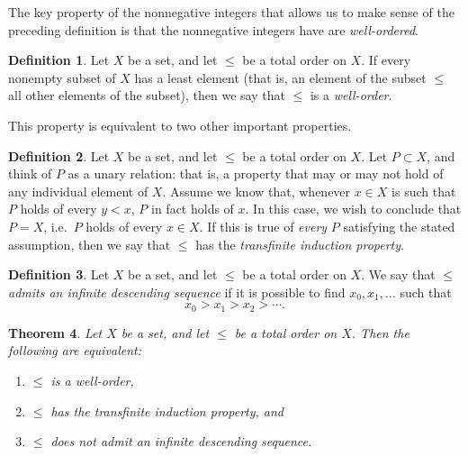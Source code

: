 \documentclass[letterpaper]{article}
\newtheorem{theorem}{Theorem}[section]
\theoremstyle{definition}
\newtheorem{definition}[theorem]{Definition}
\begin{document}
The key property of the nonnegative integers that allows us to make
sense of the preceding definition is that the nonnegative integers
have are \emph{well-ordered}.
\begin{definition}
  Let \(X\) be a set, and let \(\leq\) be a total order on \(X\).  If
  every nonempty subset of \(X\) has a least element (that is, an
  element of the subset \(\leq\) all other elements of the subset),
  then we say that \(\leq\) is a \emph{well-order}.
\end{definition}

This property is equivalent to two other important properties.
\begin{definition}
  Let \(X\) be a set, and let \(\leq\) be a total order on \(X\).  Let
  \(P \subset X\), and think of \(P\) as a unary relation: that is, a
  property that may or may not hold of any individual element of
  \(X\).  Assume we know that, whenever \(x \in X\) is such that \(P\)
  holds of every \(y < x\), \(P\) in fact holds of \(x\).  In this
  case, we wish to conclude that \(P = X\), i.e.\ \(P\) holds of every
  \(x \in X\).  If this is true of \emph{every} \(P\) satisfying the
  stated assumption, then we say that \(\leq\) has the
  \emph{transfinite induction property}.
\end{definition}
\begin{definition}
  Let \(X\) be a set, and let \(\leq\) be a total order on \(X\).  We
  say that \(\leq\) \emph{admits an infinite descending sequence} if
  it is possible to find \(x_0, x_1, \ldots\) such that
  \[x_0 > x_1 > x_2 > \cdots \text{.}\]
\end{definition}
\begin{theorem}\label{theorem:wo-tfae}
  Let \(X\) be a set, and let \(\leq\) be a total order on \(X\).
  Then the following are equivalent:
  \begin{enumerate}
    \item\label{enum:wo-tfae-wo} \(\leq\) is a well-order,
    \item\label{enum:wo-tfae-ind} \(\leq\) has the transfinite induction property, and
    \item\label{enum:wo-tfae-desc} \(\leq\) does not admit an infinite descending sequence.
  \end{enumerate}
\end{theorem}
\end{document}
